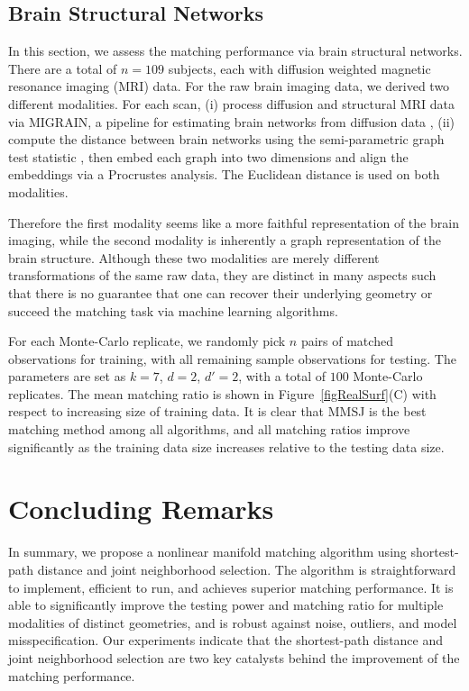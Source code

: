 \documentclass[times,twocolumn,final]{elsarticle}
\begin{document}
\subsection{Brain Structural Networks}
In this section, we assess the matching performance via brain structural networks.  There are a total of  $n=109$ subjects, each with diffusion weighted magnetic resonance imaging (MRI) data. For the raw brain imaging data, we derived two different modalities.  For each scan, (i) process diffusion and structural MRI data via MIGRAIN, a pipeline for estimating brain networks from diffusion data \cite{GrayRoncal2013}, (ii) compute the distance between brain networks using the semi-parametric graph test statistic \cite{Sussman2013,Tang2016}, then embed each graph into two dimensions and align the embeddings via a Procrustes analysis. The Euclidean distance is used on both modalities. 

Therefore the first modality seems like a more faithful representation of the brain imaging, while the second modality is inherently a graph representation of the brain structure. Although these two modalities are merely different transformations of the same raw data, they are distinct in many aspects such that there is no guarantee that one can recover their underlying geometry or succeed the matching task via machine learning algorithms.

For each Monte-Carlo replicate, we randomly pick $n$ pairs of matched observations for training, with all remaining sample observations for testing. The parameters are set as $k=7$, $d=2$, $d'=2$, with a total of $100$ Monte-Carlo replicates. The mean matching ratio is shown in Figure~\ref{figRealSurf}(C) with respect to increasing size of training data. It is clear that MMSJ is the best matching method among all algorithms, and all matching ratios improve significantly as the training data size increases relative to the testing data size.

\section{Concluding Remarks}
\label{conclu}
In summary, we propose a nonlinear manifold matching algorithm using shortest-path distance and joint neighborhood selection. The algorithm is straightforward to implement, efficient to run, and achieves superior matching performance. It is able to significantly improve the testing power and matching ratio for multiple modalities of distinct geometries, and is robust against noise, outliers, and model misspecification. Our experiments indicate that the shortest-path distance and joint neighborhood selection are two key catalysts behind the improvement of the matching performance.
\end{document}
